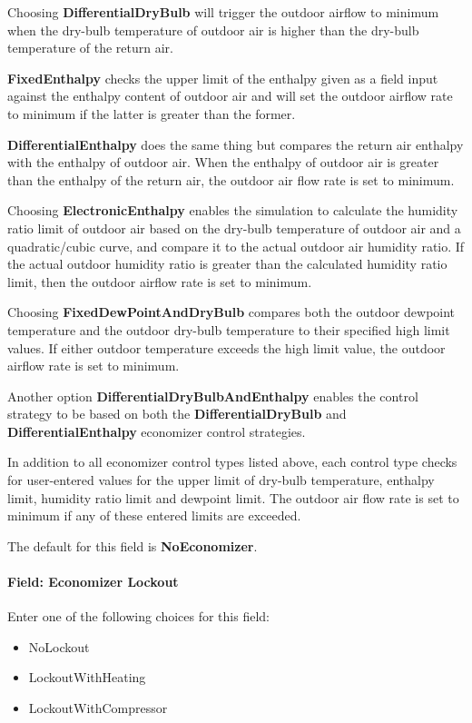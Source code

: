 Choosing \textbf{DifferentialDryBulb} will trigger the outdoor airflow to minimum when the dry-bulb temperature of outdoor air is higher than the dry-bulb temperature of the return air.

\textbf{FixedEnthalpy} checks the upper limit of the enthalpy given as a field input against the enthalpy content of outdoor air and will set the outdoor airflow rate to minimum if the latter is greater than the former.

\textbf{DifferentialEnthalpy} does the same thing but compares the return air enthalpy with the enthalpy of outdoor air. When the enthalpy of outdoor air is greater than the enthalpy of the return air, the outdoor air flow rate is set to minimum.

Choosing \textbf{ElectronicEnthalpy} enables the simulation to calculate the humidity ratio limit of outdoor air based on the dry-bulb temperature of outdoor air and a quadratic/cubic curve, and compare it to the actual outdoor air humidity ratio. If the actual outdoor humidity ratio is greater than the calculated humidity ratio limit, then the outdoor airflow rate is set to minimum.

Choosing \textbf{FixedDewPointAndDryBulb} compares both the outdoor dewpoint temperature and the outdoor dry-bulb temperature to their specified high limit values. If either outdoor temperature exceeds the high limit value, the outdoor airflow rate is set to minimum.

Another option \textbf{DifferentialDryBulbAndEnthalpy} enables the control strategy to be based on both the \textbf{DifferentialDryBulb} and \textbf{DifferentialEnthalpy} economizer control strategies.

In addition to all economizer control types listed above, each control type checks for user-entered values for the upper limit of dry-bulb temperature, enthalpy limit, humidity ratio limit and dewpoint limit. The outdoor air flow rate is set to minimum if any of these entered limits are exceeded.

The default for this field is \textbf{NoEconomizer}.

\paragraph{Field: Economizer Lockout}\label{field-economizer-lockout-000}

Enter one of the following choices for this field:

\begin{itemize}
\item
  NoLockout
\item
  LockoutWithHeating
\item
  LockoutWithCompressor
\end{itemize}


